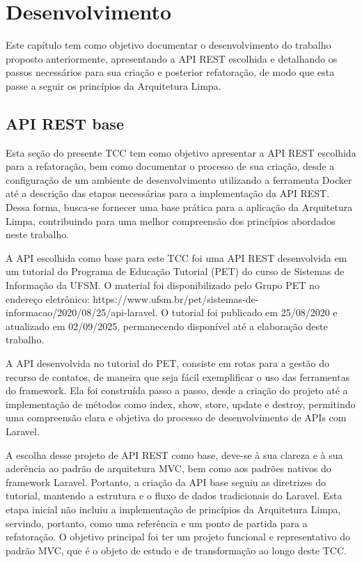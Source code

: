 \chapter{Desenvolvimento}

    \par Este capítulo tem como objetivo documentar o desenvolvimento do trabalho proposto anteriormente, apresentando a API REST escolhida e detalhando os passos necessários para sua criação e posterior refatoração, de modo que esta passe a seguir os princípios da Arquitetura Limpa.

    \section {API REST base}

        \par Esta seção do presente TCC tem como objetivo apresentar a API REST escolhida para a refatoração, bem como documentar o processo de sua criação, desde a configuração de um ambiente de desenvolvimento utilizando a ferramenta Docker até a descrição das etapas necessárias para a implementação da API REST. Dessa forma, busca-se fornecer uma base prática para a aplicação da Arquitetura Limpa, contribuindo para uma melhor compreensão dos princípios abordados neste trabalho.

        \par A API escolhida como base para este TCC foi uma API REST desenvolvida em um tutorial do Programa de Educação Tutorial (PET) do curso de Sistemas de Informação da UFSM. O material foi disponibilizado pelo Grupo PET no endereço eletrônico: https://www.ufsm.br/pet/sistemas-de-informacao/2020/08/25/api-laravel. O tutorial foi publicado em 25/08/2020 e atualizado em 02/09/2025, permanecendo disponível até a elaboração deste trabalho.

        \par A API desenvolvida no tutorial do PET, consiste em rotas para a gestão do recurso de contatos, de maneira que seja fácil exemplificar o uso das ferramentas do framework. Ela foi construída passo a passo, desde a criação do projeto até a implementação de métodos como index, show, store, update e destroy, permitindo uma compreensão clara e objetiva do processo de desenvolvimento de APIs com Laravel.
        
        \par A escolha desse projeto de API REST como base, deve-se à sua clareza e à sua aderência ao padrão de arquitetura MVC, bem como aos padrões nativos do framework Laravel. Portanto, a criação da API base seguiu as diretrizes do tutorial, mantendo a estrutura e o fluxo de dados tradicionais do Laravel. Esta etapa inicial não incluiu a implementação de princípios da Arquitetura Limpa, servindo, portanto, como uma referência e um ponto de partida para a refatoração. O objetivo principal foi ter um projeto funcional e representativo do padrão MVC, que é o objeto de estudo e de transformação ao longo deste TCC.

